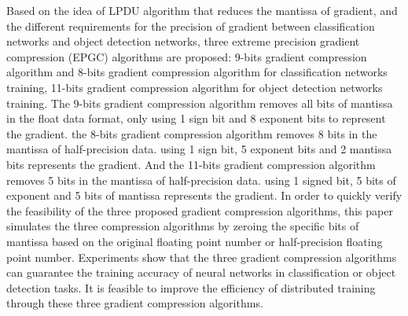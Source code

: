 \begin{eabstract}
Based on the idea of LPDU algorithm that reduces the mantissa of gradient, and the different requirements for the precision of gradient between classification networks and object detection networks, three extreme precision gradient compression (EPGC) algorithms are proposed: 9-bits gradient compression algorithm and 8-bits gradient compression algorithm for classification networks training, 11-bits gradient compression algorithm for object detection networks training. The 9-bits gradient compression algorithm removes all bits of mantissa in the float data format, only using 1 sign bit and 8 exponent bits to represent the gradient. the 8-bits gradient compression algorithm removes 8 bits in the mantissa of half-precision data. using 1 sign bit, 5 exponent bits and 2 mantissa bits represents the gradient. And the 11-bits gradient compression algorithm removes 5 bits in the mantissa of half-precision data. using 1 signed bit, 5 bits of exponent and 5 bits of mantissa represents the gradient. In order to quickly verify the feasibility of the three proposed gradient compression algorithms, this paper simulates the three compression algorithms by zeroing the specific bits of mantissa based on the original floating point number or half-precision floating point number. Experiments show that the three gradient compression algorithms can guarantee the training accuracy of neural networks in classification or object detection tasks. It is feasible to improve the efficiency of distributed training through these three gradient compression algorithms.

\end{eabstract}

